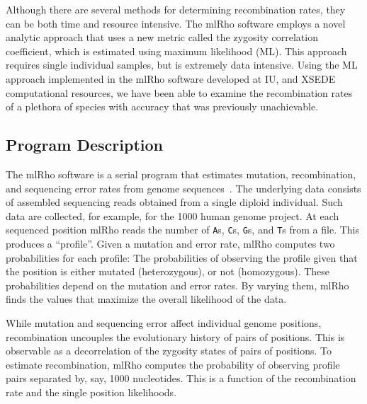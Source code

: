 \documentclass{sig-alternate}
\newcommand{\ty}{\texttt}
\begin{document}
Although there are several methods for determining recombination rates, they can be both time and resource
intensive. The mlRho software employs a novel analytic approach that uses a new metric called the zygosity
correlation coefficient, which is estimated using maximum likelihood (ML). This approach requires single individual
samples, but is extremely data intensive. Using the ML approach implemented in the mlRho software developed at
IU, and XSEDE computational resources, we have been able to examine the recombination rates of a plethora of
species with accuracy that was previously unachievable.

\subsection{Program Description}
The mlRho software is a serial program that estimates mutation, recombination, and sequencing error rates from
genome sequences~\cite{MEC:MEC4482}. The underlying data consists of assembled sequencing reads obtained from
a single diploid individual. Such data are collected, for example, for the 1000 human genome project. At each
sequenced position mlRho reads the number of \ty{A}s, \ty{C}s, \ty{G}s, and \ty{T}s from a file. This produces
a ``profile''. Given a mutation and error rate, mlRho computes two probabilities for each profile: The
probabilities of observing the profile given that the position is either mutated (heterozygous), or not
(homozygous). These probabilities depend on the mutation and error rates. By varying them, mlRho finds the
values that maximize the overall likelihood of the data.

While mutation and sequencing error affect individual genome positions, recombination uncouples the
evolutionary history of pairs of positions. This is observable as a decorrelation of the zygosity states of
pairs of positions. To estimate recombination, mlRho computes the probability of observing profile pairs
separated by, say, 1000 nucleotides. This is a function of the recombination rate and the single position
likelihoods.
\end{document}
